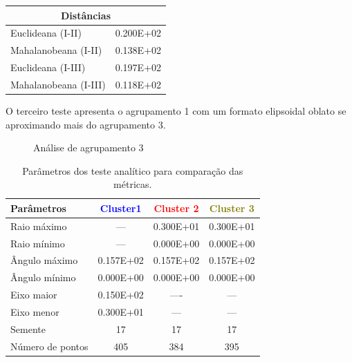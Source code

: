  \begin{table}[H]
 	\centering
 	\label{metrica2}
 	\begin{tabular}{|l|l|}
 		\hline
 		\multicolumn{2}{|c|}{Distâncias}  \\ \hline
 		Euclideana (I-II)     & 0.200E+02 \\ \hline
 		Mahalanobeana (I-II)  & 0.138E+02 \\ \hline
 		Euclideana (I-III)    & 0.197E+02 \\ \hline
 		Mahalanobeana (I-III) &  0.118E+02 \\ \hline
 	\end{tabular}
 \end{table}


O terceiro teste apresenta o agrupamento 1 com um formato elipsoidal oblato se aproximando mais do agrupamento 3. 

\begin{figure}[H]
	\centering
	\setlength{\fboxsep}{8pt}
	\setlength{\fboxrule}{0.1pt}
	\caption{Análise de agrupamento 3}
	\label{AC3}
\end{figure}

\begin{table}[H]
	\centering
	\caption{Parâmetros dos teste analítico para comparação das métricas.}
	\label{analise3}
	\begin{tabular}{lccc}
		\hline
		Parâmetros       & \textcolor{blue}{Cluster1} & \textcolor{red}{Cluster 2} & \textcolor{olive}{Cluster 3} \\ \hline
		Raio máximo      & --- & 0.300E+01 & 0.300E+01 \\
		Raio mínimo      & --- & 0.000E+00 & 0.000E+00 \\
		Ângulo máximo    & 0.157E+02 & 0.157E+02 & 0.157E+02 \\
		Ângulo mínimo    & 0.000E+00 & 0.000E+00 & 0.000E+00 \\
		Eixo maior        & 0.150E+02        & ----         & ---         \\
		Eixo menor          &  0.300E+01        & ---       & ---        \\
		Semente          & 17         & 17         & 17         \\
		Número de pontos & 405       & 384       & 395  \\   \hline
	\end{tabular}
\end{table}


